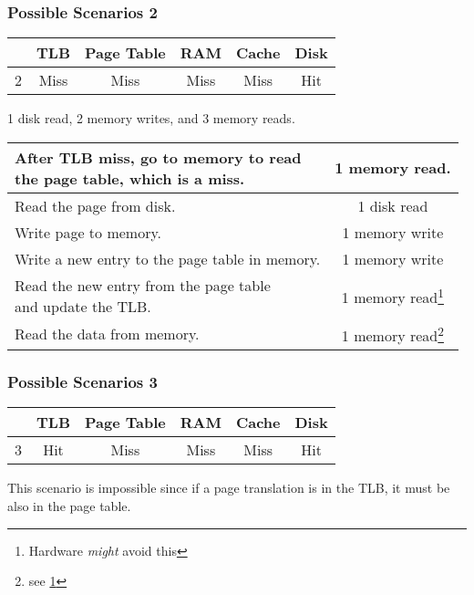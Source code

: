 \begin{frame}\frametitle{Possible Scenarios 2}
\begin{center}
	\begin{tabular}{c|c|c|c|c|c|}
  & TLB & Page Table & RAM & Cache & Disk \\ \hline
2 & Miss & Miss & Miss & Miss & Hit \\%
\end{tabular}
\end{center}
1 disk read, 2 memory writes, and 3 memory reads.
\begin{center}
\begin{tabular}{l|c}
\makecell[l]{After TLB miss, go to memory to read\\ the page table, which is a miss.} & 1 memory read. \\ \hline
Read the page from disk.                                              & 1 disk read \\ \hline
Write page to memory.                                                 & 1 memory write \\\hline
Write a new entry to the page table in memory.                        & 1 memory write \\\hline
\makecell[l]{Read the new entry from the page table\\ and update the TLB.}           & 1 memory read\footnote{\label{note1}Hardware \emph{might} avoid this} \\\hline
Read the data from memory.                                            & 1 memory read\footnote{see \ref{note1}}\\\hline
\end{tabular}
\end{center}

\end{frame}

\begin{frame}\frametitle{Possible Scenarios 3}
\begin{center}
	\begin{tabular}{c|c|c|c|c|c|}
  & TLB  & Page Table & RAM  & Cache & Disk \\ \hline
3 & Hit  & Miss       & Miss & Miss  & Hit \\ %
\end{tabular}
\end{center}
This scenario is impossible since if a page translation is in the TLB, it must be also in the page table.
\end{frame}


